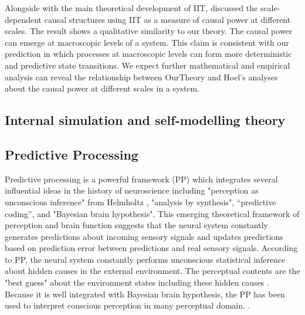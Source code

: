 \documentclass[utf8]{article}
\begin{document}
    		Alongside with the main theoretical development of IIT, \cite{hoel2016can,hoel2013quantifying} discussed the scale-dependent causal structures using IIT as a measure of causal power at different scales. The result shows a qualitative similarity to our theory. The causal power can emerge at macroscopic levels of a system. This claim is consistent with our prediction in which processes at macroscopic levels can form more deterministic and predictive state transitions. We expect further mathematical and empirical analysis can reveal the relationship between \ac{OurTheory} and Hoel's analyses about the causal power at different scales in a system.  
    		
    		\subsection{Internal simulation and self-modelling theory}



		\subsection{Predictive Processing}
    		Predictive processing is a powerful framework (PP) which integrates several influential ideas in the history of neuroscience including "perception as unconscious inference" from Helmholtz \citet{helmholtz1866concerning}, "analysis by synthesis", “predictive coding”, and "Bayesian brain hypothesis". This emerging theoretical framework of perception and brain function suggests that the neural system constantly generates predictions about incoming sensory signals and updates predictions based on prediction error between predictions and real sensory signals. According to PP, the neural system constantly performs unconscious statistical inference about hidden causes in the external environment. The perceptual contents are the "best guess" about the environment states including these hidden causes \citep{clark_2013, Hohwy2013}. Because it is well integrated with Bayesian brain hypothesis, the PP has been used to interpret conscious perception in many perceptual domain. \cite{Hohwy2013} \cite{SethPP2014}.
    		
\end{document}
